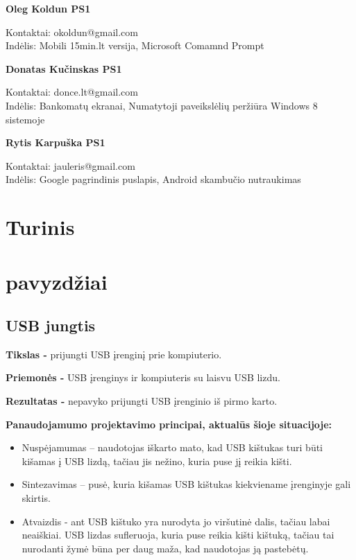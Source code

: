 ﻿\documentclass[a4paper, 12pt]{article}
\newcommand{\OK}{Oleg Koldun PS1}
\newcommand{\RK}{Rytis Karpuška PS1}
\newcommand{\DK}{Donatas Kučinskas PS1}
\begin{document}
		\textbf{\OK}
		\begin{flushleft}
		\hspace*{1.5cm}
		Kontaktai: 
			okoldun@gmail.com 
		\\
		\hspace*{1.5cm}
		Indėlis: Mobili 15min.lt versija, Microsoft Comamnd Prompt
		\end{flushleft}

		\textbf{\DK}
		\begin{flushleft}
		\hspace*{1.5cm}
		Kontaktai: 
			donce.lt@gmail.com 
		\\
		\hspace*{1.5cm}
		Indėlis: Bankomatų ekranai, Numatytoji paveikslėlių peržiūra Windows 8 sistemoje
		\end{flushleft}
		
		\textbf{\RK}
		\begin{flushleft}
		\hspace*{1.5cm}
		Kontaktai: 
			jauleris@gmail.com
		\\
		\hspace*{1.5cm}
		Indėlis: Google pagrindinis puslapis, Android skambučio nutraukimas
		\end{flushleft}
	\newpage{}	
	
\section{Turinis}
	
	\tableofcontents
	\newpage



	
\section{pavyzdžiai}
	\subsection{USB jungtis}
		\textbf{Tikslas -}
		prijungti USB įrenginį prie kompiuterio.

		\textbf{Priemonės -} 
		USB įrenginys ir kompiuteris su laisvu USB lizdu.

		\textbf{Rezultatas -}
		nepavyko prijungti USB įrenginio iš pirmo karto.

		\textbf{Panaudojamumo projektavimo principai, aktualūs šioje situacijoje:}
		\begin{itemize}
		\item Nuspėjamumas – naudotojas iškarto mato, kad USB kištukas turi būti kišamas į USB lizdą, tačiau jis nežino, kuria puse jį reikia kišti.
		\item Sintezavimas – pusė, kuria kišamas USB kištukas kiekviename įrenginyje gali skirtis.
		\item Atvaizdis - ant USB kištuko yra nurodyta jo viršutinė dalis, tačiau labai neaiškiai. USB lizdas sufleruoja, kuria puse reikia kišti kištuką, tačiau tai nurodanti žymė būna per daug maža, kad naudotojas ją pastebėtų.
		\end{itemize}
\end{document}
